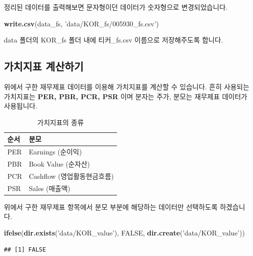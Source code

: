 \documentclass[]{book}
\newenvironment{Shaded}{\begin{snugshade}}{\end{snugshade}}
\newcommand{\KeywordTok}[1]{\textcolor[rgb]{0.13,0.29,0.53}{\textbf{#1}}}
\newcommand{\NormalTok}[1]{#1}
\newcommand{\OtherTok}[1]{\textcolor[rgb]{0.56,0.35,0.01}{#1}}
\newcommand{\StringTok}[1]{\textcolor[rgb]{0.31,0.60,0.02}{#1}}
\begin{document}
정리된 데이터를 출력해보면 문자형이던 데이터가 숫자형으로 변경되었습니다.

\begin{Shaded}
\begin{Highlighting}[]
\KeywordTok{write.csv}\NormalTok{(data_fs, }\StringTok{'data/KOR_fs/005930_fs.csv'}\NormalTok{)}
\end{Highlighting}
\end{Shaded}

data 폴더의 KOR\_fs 폴더 내에 티커\_fs.csv 이름으로 저장해주도록 합니다.

\hypertarget{section-28}{%
\subsection{가치지표 계산하기}\label{section-28}}

위에서 구한 재무제표 데이터를 이용해 가치지표를 계산할 수 있습니다. 흔히 사용되는 가치지표는 \textbf{PER, PBR, PCR, PSR} 이며 분자는 주가, 분모는 재무제표 데이터가 사용됩니다.

\begin{table}[t]

\caption{\label{tab:unnamed-chunk-18}가치지표의 종류}
\centering
\begin{tabular}{ll}
\toprule
순서 & 분모\\
\midrule
PER & Earnings (순이익)\\
PBR & Book Value (순자산)\\
PCR & Cashflow (영업활동현금흐름)\\
PSR & Sales (매출액)\\
\bottomrule
\end{tabular}
\end{table}

위에서 구한 재무제표 항목에서 분모 부분에 해당하는 데이터만 선택하도록 하겠습니다.

\begin{Shaded}
\begin{Highlighting}[]
\KeywordTok{ifelse}\NormalTok{(}\KeywordTok{dir.exists}\NormalTok{(}\StringTok{'data/KOR_value'}\NormalTok{), }\OtherTok{FALSE}\NormalTok{,}
       \KeywordTok{dir.create}\NormalTok{(}\StringTok{'data/KOR_value'}\NormalTok{))}
\end{Highlighting}
\end{Shaded}

\begin{verbatim}
## [1] FALSE
\end{verbatim}
\end{document}

